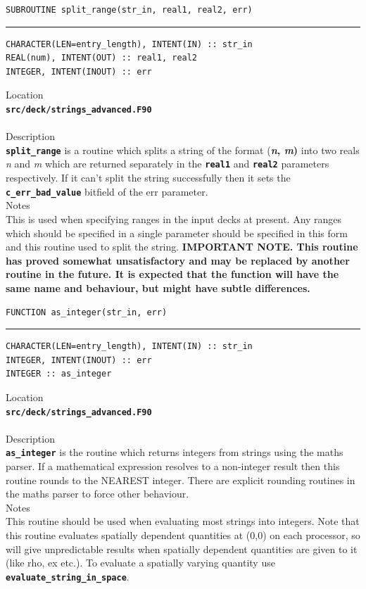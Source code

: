 \documentclass[12pt,a4paper]{article}
\newcommand{\HRule}{\rule{\linewidth}{0.5mm}}
\newcommand{\inlinecode}[1]{{\color{warwickred} \bf\texttt{#1}}}
\newcommand{\codedef}{\begin{Verbatim}[formatcom=\color{warwickred},fontsize=\Large,hfuzz=0pt]}
\newcommand{\coderule}{
{\color{warwickred}\vspace{-0.5cm}\HRule}
\codedef}
\begin{document}
\pagebreak
\codedef
SUBROUTINE split_range(str_in, real1, real2, err)
\end{Verbatim}
\coderule
CHARACTER(LEN=entry_length), INTENT(IN) :: str_in
REAL(num), INTENT(OUT) :: real1, real2
INTEGER, INTENT(INOUT) :: err
\end{Verbatim}
\vspace{1cm}
{\Large Location\\}
\inlinecode{src/deck/strings\_advanced.F90}\\
\\[0.5cm]
{\Large Description\\}
\inlinecode{split\_range} is a routine which splits a string of the format
{(\bf{\it n}, {\it m})} into two reals {\it n} and {\it m} which are returned
separately in the \inlinecode{real1} and \inlinecode{real2} parameters
respectively.  If it can't split the string successfully then it sets the
\inlinecode{c\_err\_bad\_value} bitfield of the err parameter.
\\[0.5cm]
{\Large Notes\\}
This is used when specifying ranges in the input decks at present. Any
ranges which should be specified in a single parameter should be specified in
this form and this routine used to split the string. {\bf IMPORTANT NOTE. This
routine has proved somewhat unsatisfactory and may be replaced by another
routine in the future. It is expected that the function will have the same name
and behaviour, but might have subtle differences.}

\pagebreak
\codedef
FUNCTION as_integer(str_in, err)
\end{Verbatim}
\coderule
CHARACTER(LEN=entry_length), INTENT(IN) :: str_in
INTEGER, INTENT(INOUT) :: err
INTEGER :: as_integer
\end{Verbatim}
\vspace{1cm}
{\Large Location\\}
\inlinecode{src/deck/strings\_advanced.F90}\\
\\[0.5cm]
{\Large Description\\}
\inlinecode{as\_integer} is the routine which returns integers from strings using
the maths parser. If a mathematical expression resolves to a non-integer result
then this routine rounds to the NEAREST integer. There are explicit rounding
routines in the maths parser to force other behaviour.
\\[0.5cm]
{\Large Notes\\}
This routine should be used when evaluating most strings into integers. Note
that this routine evaluates spatially dependent quantities at (0,0) on each
processor, so will give unpredictable results when spatially dependent
quantities are given to it (like rho, ex etc.). To evaluate a spatially varying
quantity use \inlinecode{evaluate\_string\_in\_space}.
\end{document}
